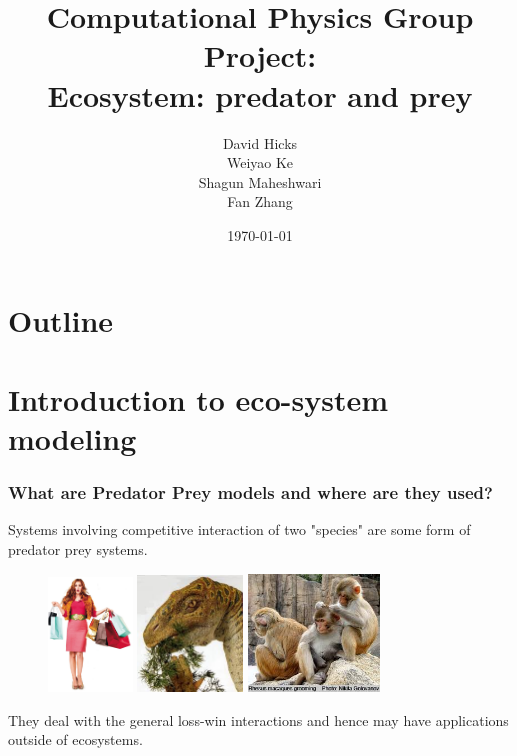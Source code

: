 \documentclass{beamer}
\title{Computational Physics Group Project: \\ Ecosystem: predator and prey}
\author{David Hicks\\ Weiyao Ke \\ Shagun Maheshwari \\ Fan Zhang}
\date{\today}
\begin{document}
\frame{\titlepage}
\section[Outline]{Outline}
\frame{\tableofcontents}

\section{Introduction to eco-system modeling}
\frame
{
	\frametitle{What are Predator Prey models and where are they used?}
	
Systems involving competitive interaction of two "species" are some form of predator prey systems. \\
\begin{figure}[H]
  	\centering
      
	\includegraphics[width = 0.2\textwidth]{./pics/resource_consumer.jpeg} 
        \includegraphics[width = 0.25\textwidth]{./pics/Plant_herbivore.jpeg} 
        \includegraphics[width = 0.31\textwidth]{./pics/Parasite_host.jpeg} 
       
        \label{Intro}
  \end{figure}

They deal with the general loss-win interactions and hence may have applications outside of ecosystems. 
}
\end{document}
